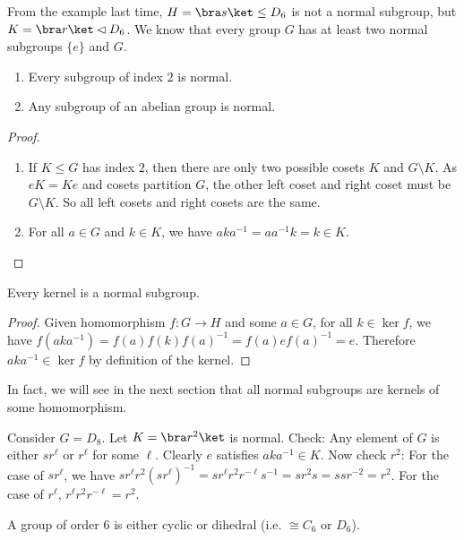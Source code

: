 \documentclass[a4paper]{article}
\begin{document}
  From the example last time, $H=\bra s\ket\leq D_6$ is not a normal subgroup, but $K=\bra r\ket \lhd D_6$. We know that every group $G$ has at least two normal subgroups $\{e\}$ and $G$.

  \begin{lemma}\leavevmode
    \begin{enumerate}
      \item Every subgroup of index $2$ is normal.
      \item Any subgroup of an abelian group is normal.
    \end{enumerate}
  \end{lemma}

  \begin{proof}\leavevmode
    \begin{enumerate}
      \item If $K\leq G$ has index $2$, then there are only two possible cosets $K$ and $G\setminus K$. As $eK = Ke$ and cosets partition $G$, the other left coset and right coset must be $G\setminus K$. So all left cosets and right cosets are the same.
      \item For all $a\in G$ and $k\in K$, we have $aka^{-1} = aa^{-1}k = k\in K$.
    \end{enumerate}
  \end{proof}
  \begin{prop}
    Every kernel is a normal subgroup. 
  \end{prop}

  \begin{proof}
    Given homomorphism $f:G\rightarrow H$ and some $a\in G$, for all $k\in \ker f$, we have $f(aka^{-1}) = f(a)f(k)f(a)^{-1} = f(a)ef(a)^{-1} = e$. Therefore $aka^{-1}\in\ker f$ by definition of the kernel.
  \end{proof}

  In fact, we will see in the next section that all normal subgroups are kernels of some homomorphism.

  \begin{eg}
    Consider $G = D_8$. Let $K = \bra r^2\ket$ is normal. Check: Any element of $G$ is either $sr^\ell$ or $r^\ell$ for some $\ell$. Clearly $e$ satisfies $aka^{-1}\in K$. Now check $r^2$: For the case of $sr^\ell$, we have $sr^\ell r^2(sr^\ell)^{-1} = sr^\ell r^2 r^{-\ell}s^{-1} = sr^2 s = ssr^{-2} = r^2$. For the case of $r^\ell$, $r^\ell r^2r^{-\ell} = r^2$.
  \end{eg}

  \begin{prop}
    A group of order $6$ is either cyclic or dihedral (i.e. $\cong C_6$ or $D_6$).
  \end{prop}
\end{document}
